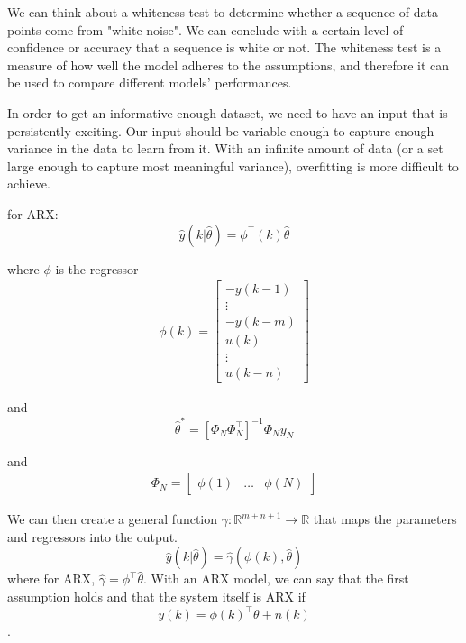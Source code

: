 \documentclass[11pt]{article}
\begin{document}
We can think about a whiteness test to determine whether a sequence of data points come from "white noise".
We can conclude with a certain level of confidence or accuracy that a sequence is white or not.
The whiteness test is a measure of how well the model adheres to the assumptions, and therefore it can be used to compare different models' performances.

In order to get an informative enough dataset, we need to have an input that is persistently exciting.
Our input should be variable enough to capture enough variance in the data to learn from it.
With an infinite amount of data (or a set large enough to capture most meaningful variance), overfitting is more difficult to achieve.

for ARX:    
\begin{equation}
    \hat{y} (k | \hat{\theta}) = \phi^\top (k) \hat{\theta}
\end{equation}

where $\phi$ is the regressor
\begin{align}
  \phi(k) = 
  \begin{bmatrix}
     - y(k-1) \\ \vdots \\ -y(k-m) \\ u(k) \\ \vdots \\ u(k-n)
  \end{bmatrix}
\end{align}

and
\begin{equation}
    \hat{\theta}^* = [\Phi_N \Phi_N^\top]^{-1} \Phi_N y_N
\end{equation}

and 
\begin{align}
  \Phi_N = 
  \begin{bmatrix}
   \phi(1) & \dots & \phi(N)
  \end{bmatrix}
\end{align}

We can then create a general function $\gamma: \mathbb{R}^{m + n +1} \to \mathbb{R}$ that maps the parameters and regressors into the output.
\begin{equation}
    \hat{y} (k | \hat{\theta}) = \hat{\gamma} (\phi(k), \hat{\theta})
\end{equation}
where for ARX, $\hat{\gamma} = \phi^\top \hat{\theta}$.
With an ARX model, we can say that the first assumption holds and that the system itself is ARX if 
\begin{equation}
    y(k) = \phi(k)^\top \theta + n(k)
\end{equation}.
\end{document}
